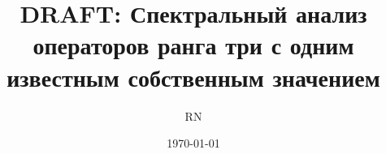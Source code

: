 \documentclass{article}
\title{DRAFT: Спектральный анализ операторов ранга три с одним известным собственным значением}
\date{\today}
\author{RN}
\theoremstyle{plain}
\theoremstyle{definition}
\begin{document}
  \maketitle
  \vfill

  \tableofcontents

  
  
\end{document}
